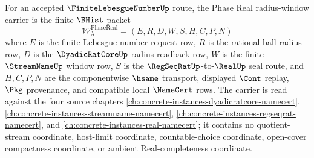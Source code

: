 \begin{definition}
\label{def:finite-lebesgue-number-phase-real-radius-window-carrier}
For an accepted $\FiniteLebesgueNumberUp$ route, the Phase Real radius-window carrier is the finite $\BHist$ packet
$$
\mathcal{W}_{\lambda}^{\mathrm{PhaseReal}}=(E,R,D,W,S,H,C,P,N)
$$
where $E$ is the finite Lebesgue-number request row, $R$ is the rational-ball radius row, $D$ is the $\DyadicRatCoreUp$ radius readback row, $W$ is the finite $\StreamNameUp$ window row, $S$ is the $\RegSeqRatUp$-to-$\RealUp$ seal route, and $H,C,P,N$ are the componentwise $\hsame$ transport, displayed $\Cont$ replay, $\Pkg$ provenance, and compatible local $\NameCert$ rows. The carrier is read against the four source chapters \autoref{ch:concrete-instances-dyadicratcore-namecert}, \autoref{ch:concrete-instances-streamname-namecert}, \autoref{ch:concrete-instances-regseqrat-namecert}, and \autoref{ch:concrete-instances-real-namecert}; it contains no quotient-stream coordinate, host-limit coordinate, countable-choice coordinate, open-cover compactness coordinate, or ambient Real-completeness coordinate.
\end{definition}

